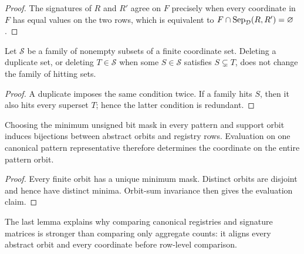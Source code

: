 \begin{proof}
The signatures of $R$ and $R'$ agree on $F$ precisely when every coordinate in
$F$ has equal values on the two rows, which is equivalent to
$F\cap\operatorname{Sep}_{\mathcal{D}}(R,R')=\varnothing$.
\end{proof}

\begin{lemma}
Let $\mathcal S$ be a family of nonempty subsets of a finite coordinate set.
Deleting a duplicate set, or deleting $T\in\mathcal S$ when some
$S\in\mathcal S$ satisfies $S\subsetneq T$, does not change the family of
hitting sets.
\end{lemma}

\begin{proof}
A duplicate imposes the same condition twice.  If a family hits $S$, then it
also hits every superset $T$; hence the latter condition is redundant.
\end{proof}

\begin{lemma}
Choosing the minimum unsigned bit mask in every pattern and support orbit
induces bijections between abstract orbits and registry rows.  Evaluation on
one canonical pattern representative therefore determines the coordinate on
the entire pattern orbit.
\end{lemma}

\begin{proof}
Every finite orbit has a unique minimum mask.  Distinct orbits are disjoint and
hence have distinct minima.  Orbit-sum invariance then gives the evaluation
claim.
\end{proof}

The last lemma explains why comparing canonical registries and signature
matrices is stronger than comparing only aggregate counts: it aligns every
abstract orbit and every coordinate before row-level comparison.
